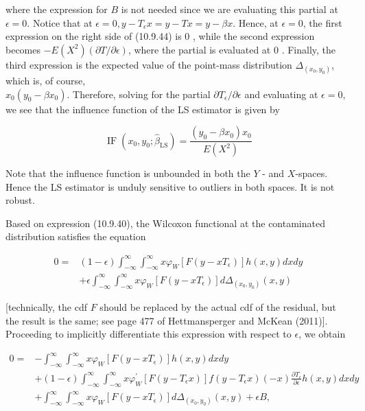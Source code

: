 where the expression for $B$ is not needed since we are evaluating this partial at $\epsilon=0$. Notice that at $\epsilon=0, y-T_{\epsilon} x=y-T x=y-\beta x$. Hence, at $\epsilon=0$, the first expression on the right side of (10.9.44) is 0 , while the second expression becomes $-E\left(X^{2}\right)(\partial T / \partial \epsilon)$, where the partial is evaluated at 0 . Finally, the third expression is the expected value of the point-mass distribution $\Delta_{\left(x_{0}, y_{0}\right)}$, which is, of course,\\
$x_{0}\left(y_{0}-\beta x_{0}\right)$. Therefore, solving for the partial $\partial T_{\epsilon} / \partial \epsilon$ and evaluating at $\epsilon=0$, we see that the influence function of the LS estimator is given by


\begin{equation*}
\operatorname{IF}\left(x_{0}, y_{0} ; \widehat{\beta}_{\mathrm{LS}}\right)=\frac{\left(y_{0}-\beta x_{0}\right) x_{0}}{E\left(X^{2}\right)} \tag{10.9.45}
\end{equation*}


Note that the influence function is unbounded in both the $Y$ - and $X$-spaces. Hence the LS estimator is unduly sensitive to outliers in both spaces. It is not robust.

Based on expression (10.9.40), the Wilcoxon functional at the contaminated distribution satisfies the equation


\begin{align*}
0= & (1-\epsilon) \int_{-\infty}^{\infty} \int_{-\infty}^{\infty} x \varphi_{W}\left[F\left(y-x T_{\epsilon}\right)\right] h(x, y) d x d y \\
& +\epsilon \int_{-\infty}^{\infty} \int_{-\infty}^{\infty} x \varphi_{W}\left[F\left(y-x T_{\epsilon}\right)\right] d \Delta_{\left(x_{0}, y_{0}\right)}(x, y) \tag{10.9.46}
\end{align*}


[technically, the cdf $F$ should be replaced by the actual cdf of the residual, but the result is the same; see page 477 of Hettmansperger and McKean (2011)]. Proceeding to implicitly differentiate this expression with respect to $\epsilon$, we obtain


\begin{align*}
0= & -\int_{-\infty}^{\infty} \int_{-\infty}^{\infty} x \varphi_{W}\left[F\left(y-x T_{\epsilon}\right)\right] h(x, y) d x d y \\
& +(1-\epsilon) \int_{-\infty}^{\infty} \int_{-\infty}^{\infty} x \varphi_{W}^{\prime}\left[F\left(y-T_{\epsilon} x\right)\right] f\left(y-T_{\epsilon} x\right)(-x) \frac{\partial T_{\epsilon}}{\partial \epsilon} h(x, y) d x d y \\
& +\int_{-\infty}^{\infty} \int_{-\infty}^{\infty} x \varphi_{W}\left[F\left(y-x T_{\epsilon}\right)\right] d \Delta_{\left(x_{0}, y_{0}\right)}(x, y)+\epsilon B, \tag{10.9.47}
\end{align*}


